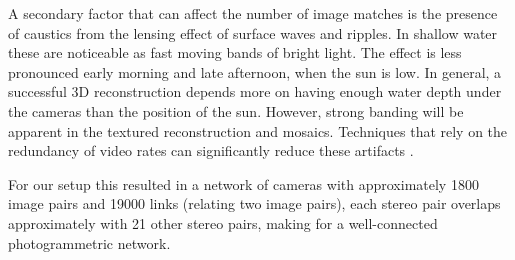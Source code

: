 A secondary factor that can affect the number of image matches is the presence of caustics from the lensing effect of surface waves and ripples. In shallow water these are noticeable as fast moving bands of bright light. The effect is less pronounced early morning and late afternoon, when the sun is low. In general, a successful 3D reconstruction depends more on having enough water depth under the cameras than the position of the sun. However, strong banding will be apparent in the textured reconstruction and mosaics. Techniques that rely on the redundancy of video rates can significantly reduce these artifacts \cite{Gracias_2008}.

For our setup this resulted in a network of cameras with approximately 1800 image pairs and 19000 links (relating two image pairs), each stereo pair overlaps approximately with 21 other stereo pairs, making for a well-connected photogrammetric network.


    
  
  
